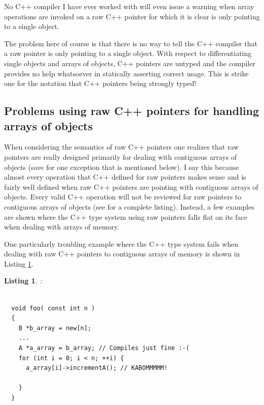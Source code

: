 \documentclass[pdf,ps2pdf,11pt]{SANDreport}
\newtheorem{listing}{Listing}
\begin{document}
No C++ compiler I have ever worked with will even issue a warning when
array operations are invoked on a raw C++ pointer for which it is
clear is only pointing to a single object.

The problem here of course is that there is no way to tell the C++
compiler that a raw pointer is only pointing to a single object.  With
respect to differentiating single objects and arrays of objects, C++
pointers are untyped and the compiler provides no help whatsoever in
statically asserting correct usage.  This is strike one for the
notation that C++ pointers being strongly typed!


%
{}\subsection{Problems using raw C++ pointers for handling arrays of
objects}
\label{sec:problem-with-raw-array-pointers}
%

When considering the semantics of raw C++ pointers one realizes that
raw pointers are really designed primarily for dealing with contiguous
arrays of objects (save for one exception that is mentioned below).  I
say this because almost every operation that C++ defined for raw
pointers makes sense and is fairly well defined when raw C++ pointers
are pointing with contiguous arrays of objects.  Every valid C++
operation will not be reviewed for raw pointers to contiguous arrays
of objects (see {}\cite{stroustrup97} for a complete listing).
Instead, a few examples are shown where the C++ type system using raw
pointers falls flat on its face when dealing with arrays of memory.

One particularly troubling example where the C++ type system fails
when dealing with raw C++ pointers to contiguous arrays of memory is
shown in Listing {}\ref{listing:BadArrayPointerConversion}.

\begin{listing}:\\
\label{listing:BadArrayPointerConversion}
{\small\begin{verbatim}

  void foo( const int n )
  {
    B *b_array = new[n];
    ...
    A *a_array = b_array; // Compiles just fine :-(
    for (int i = 0; i < n; ++i) {
      a_array[i]->incrementA(); // KABOMMMMM!

    }
  }

\end{verbatim}}
\end{listing}
\end{document}
